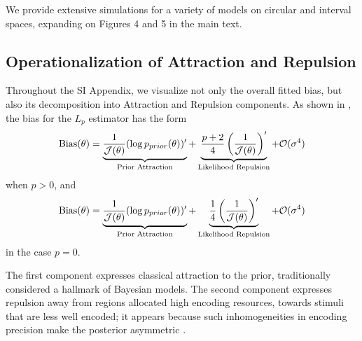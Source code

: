 \documentclass[si.tex]{subfiles}
\begin{document}
We provide extensive simulations for a variety of models on circular and interval spaces, expanding on Figures 4 and 5 in the main text.

\subsection{Operationalization of Attraction and Repulsion}\label{sec:att-rep}

Throughout the SI Appendix, we visualize not only the overall fitted bias, but also its decomposition into Attraction and Repulsion components.
As shown in \cite{hahn2024unifying}, the bias for the $L_p$ estimator has the form
\begin{equation}\label{eq:ana-bias-att-rep}
    \text{Bias}(\theta) = \underbrace{\frac{1}{\mathcal{J}(\theta)} (\log p_{prior}(\theta))'}_{\text{Prior Attraction}} + \underbrace{\frac{p+2}{4} \left(\frac{1}{\mathcal{J}(\theta)}\right)'}_{\text{Likelihood Repulsion}} + \mathcal{O}(\sigma^4)
\end{equation}
when $p > 0$, and
\begin{equation}\label{eq:ana-bias-att-rep-0}
    \text{Bias}(\theta) = \underbrace{\frac{1}{\mathcal{J}(\theta)} (\log p_{prior}(\theta))'}_{\text{Prior Attraction}} + \underbrace{\frac{1}{4} \left(\frac{1}{\mathcal{J}(\theta)}\right)'}_{\text{Likelihood Repulsion}} + \mathcal{O}(\sigma^4)
\end{equation}
in the case $p=0$.

The first component expresses classical attraction  to the prior, traditionally considered a hallmark of Bayesian models.
The second component expresses repulsion away from regions allocated high encoding resources, towards stimuli that are less well encoded; it appears because such inhomogeneities in encoding precision make the posterior asymmetric \citep{Wei2012,Wei2015ABO,Wei2017LawfulRB,PratCarrabin2021BiasAV,hahn2024unifying}.
\end{document}
